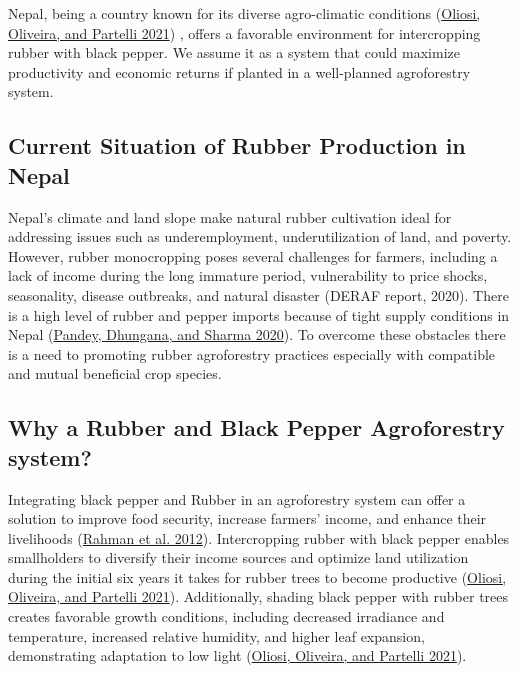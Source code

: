 \documentclass[
]{article}
\begin{document}
Nepal, being a country known for its diverse agro-climatic conditions (\protect\hyperlink{ref-oliosi2021}{Oliosi, Oliveira, and Partelli 2021}) , offers a favorable environment for intercropping rubber with black pepper. We assume it as a system that could maximize productivity and economic returns if planted in a well-planned agroforestry system.

\hypertarget{current-situation-of-rubber-production-in-nepal}{%
\subsection{Current Situation of Rubber Production in Nepal}\label{current-situation-of-rubber-production-in-nepal}}

Nepal's climate and land slope make natural rubber cultivation ideal for addressing issues such as underemployment, underutilization of land, and poverty. However, rubber monocropping poses several challenges for farmers, including a lack of income during the long immature period, vulnerability to price shocks, seasonality, disease outbreaks, and natural disaster (DERAF report, 2020). There is a high level of rubber and pepper imports because of tight supply conditions in Nepal (\protect\hyperlink{ref-pandey2020}{Pandey, Dhungana, and Sharma 2020}). To overcome these obstacles there is a need to promoting rubber agroforestry practices especially with compatible and mutual beneficial crop species.

\hypertarget{why-a-rubber-and-black-pepper-agroforestry-system}{%
\subsection{Why a Rubber and Black Pepper Agroforestry system?}\label{why-a-rubber-and-black-pepper-agroforestry-system}}

Integrating black pepper and Rubber in an agroforestry system can offer a solution to improve food security, increase farmers' income, and enhance their livelihoods (\protect\hyperlink{ref-rahman2012}{Rahman et al. 2012}). Intercropping rubber with black pepper enables smallholders to diversify their income sources and optimize land utilization during the initial six years it takes for rubber trees to become productive (\protect\hyperlink{ref-oliosi2021}{Oliosi, Oliveira, and Partelli 2021}). Additionally, shading black pepper with rubber trees creates favorable growth conditions, including decreased irradiance and temperature, increased relative humidity, and higher leaf expansion, demonstrating adaptation to low light (\protect\hyperlink{ref-oliosi2021}{Oliosi, Oliveira, and Partelli 2021}).
\end{document}
